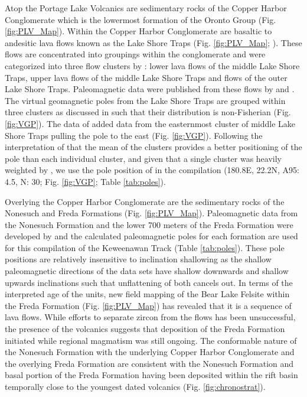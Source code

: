 \documentclass[11pt,letterpaper]{article}
\begin{document}
Atop the Portage Lake Volcanics are sedimentary rocks of the Copper Harbor Conglomerate which is the lowermost formation of the Oronto Group (Fig. \ref{fig:PLV_Map}). Within the Copper Harbor Conglomerate are basaltic to andesitic lava flows known as the Lake Shore Traps (Fig. \ref{fig:PLV_Map}; \citealp{Lane1907a}). These flows are concentrated into groupings within the conglomerate and were categorized into three flow clusters by \cite{Diehl1994a}: lower lava flows of the middle Lake Shore Traps, upper lava flows of the middle Lake Shore Traps and flows of the outer Lake Shore Traps. Paleomagnetic data were published from these flows by \cite{Diehl1994a} and \cite{Kulakov2013a}. The virtual geomagnetic poles from the Lake Shore Traps are grouped within three clusters as discussed in \cite{Diehl1994a} such that their distribution is non-Fisherian (Fig. \ref{fig:VGP}). The data of \cite{Kulakov2013a} added data from the easternmost cluster of middle Lake Shore Traps pulling the pole to the east (Fig. \ref{fig:VGP}). Following the interpretation of \cite{Diehl1994a} that the mean of the clusters provides a better positioning of the pole than each individual cluster, and given that a single cluster was heavily weighted by \cite{Kulakov2013a}, we use the pole position of \cite{Diehl1994a} in the compilation (180.8\textdegree E, 22.2\textdegree N, A95: 4.5\textdegree, N: 30; Fig. \ref{fig:VGP}; Table \ref{tab:poles}).

Overlying the Copper Harbor Conglomerate are the sedimentary rocks of the Nonesuch and Freda Formations (Fig. \ref{fig:PLV_Map}). Paleomagnetic data from the Nonesuch Formation and the lower 700 meters of the Freda Formation were developed by \cite{Henry1977a} and the calculated paleomagnetic poles for each formation are used for this compilation of the Keweenawan Track (Table \ref{tab:poles}). These pole positions are relatively insensitive to inclination shallowing as the shallow paleomagnetic directions of the data sets have shallow downwards and shallow upwards inclinations such that unflattening of both cancels out. In terms of the interpreted age of the units, new field mapping of the Bear Lake Felsite within the Freda Formation (Fig. \ref{fig:PLV_Map}) has revealed that it is a sequence of lava flows. While efforts to separate zircon from the flows has been unsuccessful, the presence of the volcanics suggests that deposition of the Freda Formation initiated while regional magmatism was still ongoing. The conformable nature of the Nonesuch Formation with the underlying Copper Harbor Conglomerate and the overlying Freda Formation are consistent with the Nonesuch Formation and basal portion of the Freda Formation having been deposited within the rift basin temporally close to the youngest dated volcanics (Fig. \ref{fig:chronostrat}).
\end{document}
